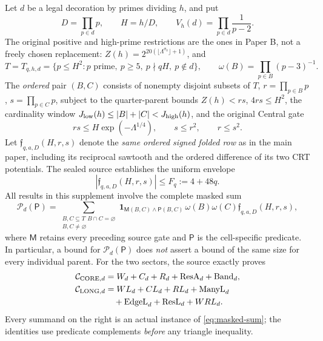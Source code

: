 \documentclass[11pt]{article}
\newcommand{\Lam}{\Lambda}
\newcommand{\one}{\mathbf 1}
\newcommand{\omegaR}{\omega}
\newcommand{\MR}{\mathsf M}
\newcommand{\F}{\mathfrak f}
\newcommand{\csmall}{\mathrm{CORE}}
\newcommand{\clong}{\mathrm{LONG}}
\theoremstyle{definition}
\theoremstyle{remark}
\newcommand{\1}{\mathbf 1}
\begin{document}
Let $d$ be a legal decoration by primes dividing $h$, and put
\[
 D=\prod_{p\in d}p,\qquad H=h/D,\qquad
 V_h(d)=\prod_{p\in d}\frac1{p-2}.
\]
The original positive and high-prime restrictions are the ones in
Paper B, not a freely chosen replacement: $Z(h)=2^{20(\lfloor
\Lam^{\sigma_0}\rfloor+1)}$, and
\begin{equation}\label{eq:physical-universe}
 T=T_{q,h,d}=\{p\le H^2: p\text{ prime},\ p\ge5,
       \ p\nmid qH,\ p\notin d\},\qquad
 \omegaR(B)=\prod_{p\in B}(p-3)^{-1}.
\end{equation}
The \emph{ordered} pair $(B,C)$ consists of nonempty disjoint subsets
of $T$, $r=\prod_{p\in B}p$, $s=\prod_{p\in C}p$,
subject to the quarter-parent bounds
$Z(h)<rs$, $4rs\le H^2$, the cardinality window
$J_{\rm low}(h)\le |B|+|C|<J_{\rm high}(h)$, and the original Central gate
\begin{equation}\label{eq:central-gate}
 rs\le H\exp(-\Lam^{1/4}),\qquad s\le r^2,\qquad r\le s^2.
\end{equation}
Let $\F_{q,a,D}(H,r,s)$ denote the \emph{same ordered signed
folded row} as in the main paper, including its reciprocal sawtooth
and the ordered difference of its two CRT potentials. The sealed
source establishes the uniform envelope
\begin{equation}\label{eq:row-envelope}
 |\F_{q,a,D}(H,r,s)|\le F_q:=4+48q.
\end{equation}
All results in this supplement involve the complete masked sum
\begin{equation}\label{eq:masked-sum}
 \mathcal P_d(\mathsf P)=
 \sum_{\substack{B,C\subseteq T\ \,B\cap C=\varnothing\\B,C\ne\varnothing}}
 \one_{\MR(B,C)\wedge\mathsf P(B,C)}\,
 \omegaR(B)\omegaR(C)\F_{q,a,D}(H,r,s),
\end{equation}
where $\MR$ retains every preceding source gate and $\mathsf P$
is the cell-specific predicate. In particular, a bound for
$\mathcal P_d(\mathsf P)$ does \emph{not} assert a bound of the same
size for every individual parent. For the two sectors, the source
exactly proves
\begin{align}
\mathcal C_{\csmall,d}&=W_d+C_d+R_d+\mathrm{ResA}_d+\mathrm{Band}_d,\notag\\
\mathcal C_{\clong,d}&=WL_d+CL_d+RL_d+\mathrm{ManyL}_d\notag\\
&\quad+\mathrm{EdgeL}_d+\mathrm{ResL}_d+WRL_d.
\label{eq:sector-identity}
\end{align}
Every summand on the right is an actual instance of
\eqref{eq:masked-sum}; the identities use predicate complements
\emph{before} any triangle inequality.
\end{document}
